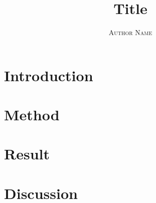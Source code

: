 \documentclass{article}
\title{\vspace{-3.5cm} Title
}
\author{%
	\large
	\textsc{Author Name}\\
	\vspace{-5mm}
	}
\begin{document}
\maketitle

\section*{Introduction}

\section*{Method}

\section*{Result}

\section*{Discussion}
\end{document}
